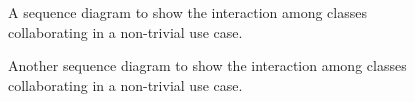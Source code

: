 \begin{figure}
  \centering
  \caption{\label{Figure::bookstoreSequence} A sequence diagram to show the 
    interaction among classes collaborating in a non-trivial use case.}
\end{figure}

\begin{figure}
  \centering
  \caption{\label{Figure::bookstoreSequence2} Another sequence diagram to show the 
    interaction among classes collaborating in a non-trivial use case.}
\end{figure}